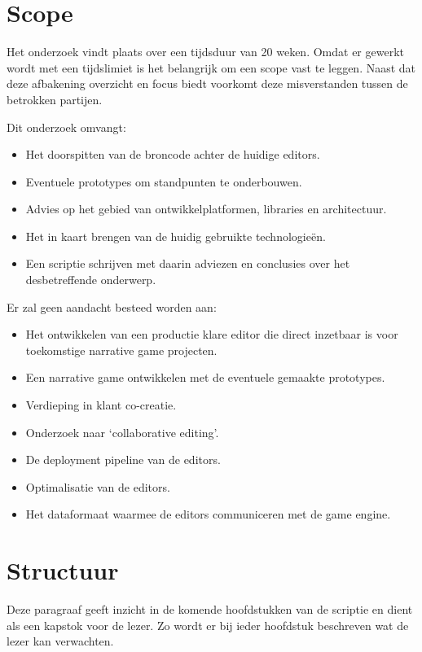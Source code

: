 \pagebreak
\section{Scope}
Het onderzoek vindt plaats over een tijdsduur van 20 weken. Omdat er gewerkt wordt met een tijdslimiet is het belangrijk om een scope vast te leggen. Naast dat deze afbakening overzicht en focus biedt voorkomt deze misverstanden tussen de betrokken partijen.

\noindent Dit onderzoek omvangt:
\begin{itemize}
    \item Het doorspitten van de broncode achter de huidige editors.
    \item Eventuele prototypes om standpunten te onderbouwen.
    \item Advies op het gebied van ontwikkelplatformen, libraries en architectuur.
    \item Het in kaart brengen van de huidig gebruikte technologieën.
    \item Een scriptie schrijven met daarin adviezen en conclusies over het desbetreffende onderwerp.
\end{itemize}

\noindent Er zal geen aandacht besteed worden aan:
\begin{itemize}
    \item Het ontwikkelen van een productie klare editor die direct inzetbaar is voor toekomstige narrative game projecten.
    \item Een narrative game ontwikkelen met de eventuele gemaakte prototypes.
    \item Verdieping in klant co-creatie.
    \item Onderzoek naar ‘collaborative editing’.
    \item De deployment pipeline van de editors.
    \item Optimalisatie van de editors.
    \item Het dataformaat waarmee de editors communiceren met de game engine.
\end{itemize}

\pagebreak
\section{Structuur}
Deze paragraaf geeft inzicht in de komende hoofdstukken van de scriptie en dient als een kapstok voor de lezer. Zo wordt er bij ieder hoofdstuk beschreven wat de lezer kan verwachten.

